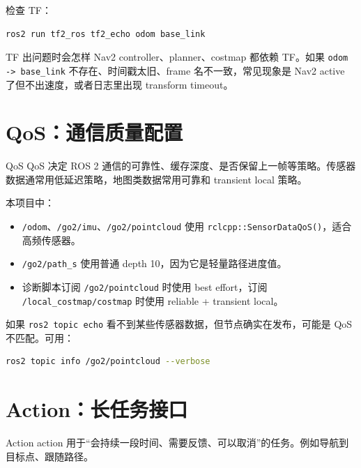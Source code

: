 \documentclass[UTF8,11pt,a4paper,openany]{ctexrep}
\newcommand{\code}[1]{\nolinkurl{#1}}
\newcommand{\topic}[1]{\nolinkurl{#1}}
\begin{document}
检查 TF：

\begin{lstlisting}[language=bash]
ros2 run tf2_ros tf2_echo odom base_link
\end{lstlisting}

\begin{warnbox}{TF 出问题时会怎样}
Nav2 controller、planner、costmap 都依赖 TF。如果 \code{odom -> base_link} 不存在、时间戳太旧、frame 名不一致，常见现象是 Nav2 active 了但不出速度，或者日志里出现 transform timeout。
\end{warnbox}

\section{QoS：通信质量配置}

\begin{termdef}{QoS}
QoS 决定 ROS 2 通信的可靠性、缓存深度、是否保留上一帧等策略。传感器数据通常用低延迟策略，地图类数据常用可靠和 transient local 策略。
\end{termdef}

本项目中：

\begin{itemize}
  \item \topic{/odom}、\topic{/go2/imu}、\topic{/go2/pointcloud} 使用 \code{rclcpp::SensorDataQoS()}，适合高频传感器。
  \item \topic{/go2/path_s} 使用普通 depth 10，因为它是轻量路径进度值。
  \item 诊断脚本订阅 \topic{/go2/pointcloud} 时使用 best effort，订阅 \topic{/local_costmap/costmap} 时使用 reliable + transient local。
\end{itemize}

如果 \code{ros2 topic echo} 看不到某些传感器数据，但节点确实在发布，可能是 QoS 不匹配。可用：

\begin{lstlisting}[language=bash]
ros2 topic info /go2/pointcloud --verbose
\end{lstlisting}

\section{Action：长任务接口}

\begin{termdef}{Action}
action 用于“会持续一段时间、需要反馈、可以取消”的任务。例如导航到目标点、跟随路径。
\end{termdef}
\end{document}
